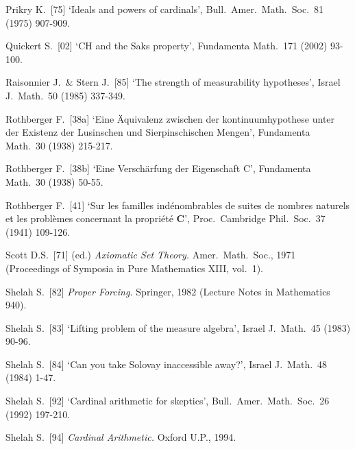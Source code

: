 {%

Prikry K.\ [75] `Ideals and powers of cardinals', Bull.\
Amer.\ Math.\ Soc.\ 81 (1975) 907-909.
\cmmnt{[555N.]}

\medskip%

Quickert S.\ [02] `CH and the Saks property', Fundamenta Math.\ 171
(2002) 93-100.
\cmmnt{[539L.]}

\medskip%

Raisonnier J.\ \& Stern J.\ [85] `The strength of measurability hypotheses', Israel J.\ Math.\ 50 (1985) 337-349.
\cmmnt{[Chap.\ 52 {\it intro.}, 522Q.]}



Rothberger F.\ [38a] `Eine \"Aquivalenz zwischen der kontinuumhypothese
unter der Existenz der Lusinschen und Sierpinschischen Mengen',
Fundamenta Math.\ 30 (1938) 215-217.
\cmmnt{[522G.]}

Rothberger F.\ [38b] `Eine Versch\"arfung der Eigenschaft C',
Fundamenta Math.\ 30 (1938) 50-55.
\cmmnt{[\S534 {\it notes\/}.]}

Rothberger F.\ [41] `Sur les familles ind\'enombrables de suites de nombres naturels et les probl\`emes concernant la propri\'et\'e {\bf C}', Proc.\ Cambridge Phil.\ Soc.\ 37 (1941) 109-126.
\cmmnt{[534O.]}

\medskip%

Scott D.S.\ [71] (ed.) {\it Axiomatic Set Theory.}  Amer.\
Math.\ Soc., 1971
(Proceedings of Symposia in Pure Mathematics XIII, vol.\ 1).

Shelah S.\ [82] {\it Proper Forcing.}  Springer, 1982
(Lecture Notes in Mathematics 940).
\cmmnt{[\S538 {\it notes\/}.]}

Shelah S.\ [83] `Lifting problem of the measure algebra', Israel J.\
Math.\ 45 (1983) 90-96.   %
\cmmnt{[\S535 {\it notes\/}.]}

Shelah S.\ [84] `Can you take Solovay inaccessible away?', Israel J.\ Math.\ 48 (1984) 1-47.
\cmmnt{[\S522 {\it notes\/}.]}

Shelah S.\ [92] `Cardinal arithmetic for skeptics',
Bull.\ Amer.\ Math.\ Soc.\ 26 (1992) 197-210.
\cmmnt{[5A2D.]}

Shelah S.\ [94] {\it Cardinal Arithmetic.}  Oxford U.P., 1994.
\cmmnt{[5A2D, 5A2G.]}

}
